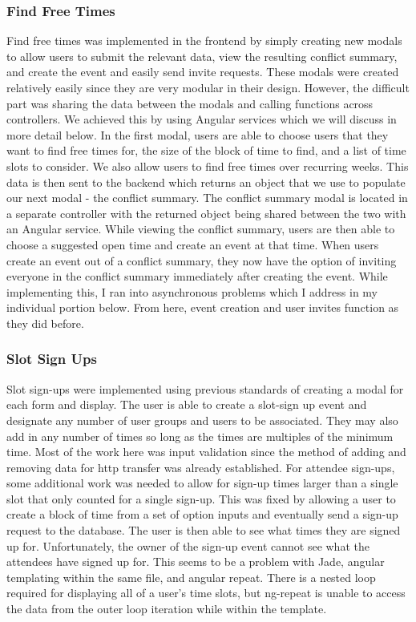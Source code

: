 \documentclass[11pt]{article}   %
\begin{document}
\subsubsection{Find Free Times}
Find free times was implemented in the frontend by simply creating new modals to allow users to submit the relevant data, view the resulting conflict summary, and create the event and easily send invite requests. These modals were created relatively easily since they are very modular in their design. However, the difficult part was sharing the data between the modals and calling functions across controllers. We achieved this by using Angular services which we will discuss in more detail below. In the first modal, users are able to choose users that they want to find free times for, the size of the block of time to find, and a list of time slots to consider. We also allow users to find free times over recurring weeks. This data is then sent to the backend which returns an object that we use to populate our next modal - the conflict summary. The conflict summary modal is located in a separate controller with the returned object being shared between the two with an Angular service. While viewing the conflict summary, users are then able to choose a suggested open time and create an event at that time. When users create an event out of a conflict summary, they now have the option of inviting everyone in the conflict summary immediately after creating the event. While implementing this, I ran into asynchronous problems which I address in my individual portion below. From here, event creation and user invites function as they did before.

\subsubsection{Slot Sign Ups}
Slot sign-ups were implemented using previous standards of creating a modal for each form and display. The user is able to create a slot-sign up event and designate any number of user groups and users to be associated. They may also add in any number of times so long as the times are multiples of the minimum time. Most of the work here was input validation since the method of adding and removing data for http transfer was already established. For attendee sign-ups, some additional work was needed to allow for sign-up times larger than a single slot that only counted for a single sign-up. This was fixed by allowing a user to create a block of time from a set of option inputs and eventually send a sign-up request to the database. The user is then able to see what times they are signed up for. Unfortunately, the owner of the sign-up event cannot see what the attendees have signed up for. This seems to be a problem with Jade, angular templating within the same file, and angular repeat. There is a nested loop required for displaying all of a user's time slots, but ng-repeat is unable to access the data from the outer loop iteration while within the template.
\end{document}
